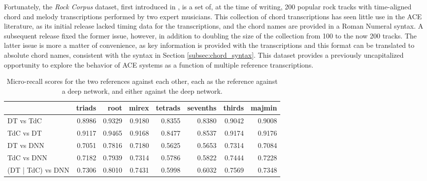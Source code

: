 Fortunately, the \emph{Rock Corpus} dataset, first introduced in \cite{deClerqc2010}, is a set of, at the time of writing, 200 popular rock tracks with time-aligned chord and melody transcriptions performed by two expert musicians.
This collection of chord transcriptions has seen little use in the ACE literature, as its initial release lacked timing data for the transcriptions, and the chord names are provided in a Roman Numeral syntax.
A subsequent release fixed the former issue, however, in addition to doubling the size of the collection from 100 to the now 200 tracks.
The latter issue is more a matter of convenience, as key information is provided with the transcriptions and this format can be translated to absolute chord names, consistent with the syntax in Section \ref{subsec:chord_syntax}.
This dataset provides a previously uncapitalized opportunity to explore the behavior of ACE systems as a function of multiple reference transcriptions.




%



\begin{table}[h]
\begin{center}
\scriptsize
\caption{Micro-recall scores for the two references against each other, each as the reference against a deep network, and either against the deep network.}
\label{tab:rc_}

\begin{tabular}{lrrrrrrr}
\hline
         &   triads &   root &   mirex &   tetrads &   sevenths &   thirds &   majmin \\
\hline
DT vs TdC  &  0.8986 & 0.9329 &  0.9180  &   0.8355  &    0.8380  &   0.9042  &  0.9008 \\
TdC vs DT &   0.9117 & 0.9465 &  0.9168  &   0.8477  &    0.8537 &   0.9174 &    0.9176 \\
\hline
DT vs DNN  &   0.7051 & 0.7816 &  0.7180  &   0.5625   &   0.5653  &  0.7314  &  0.7084 \\
TdC vs DNN  & 0.7182 & 0.7939 & 0.7314  &   0.5786  &    0.5822 &   0.7444 &   0.7228 \\
\hline
(DT | TdC) vs DNN & 0.7306 & 0.8010 & 0.7431  &   0.5998  &    0.6032 &   0.7569  &  0.7348\\
\hline
\end{tabular}
\end{center}
\end{table}

